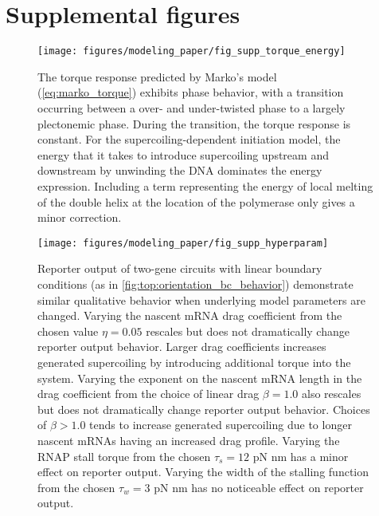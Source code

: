 \documentclass[11pt]{article}
\begin{document}
\section{Supplemental figures}
\FloatBarrier
\begin{figure}[htbp]
    \centering
    {\texttt{[image: figures/modeling\_paper/fig\_supp\_torque\_energy]}
    \label{fig:supp:torque_diagram}
    \label{fig:supp:energy_with_melting}
    }
    \caption{
         The torque response predicted by Marko's model (\cref{eq:marko_torque}) exhibits phase behavior, with a transition occurring between a over- and under-twisted phase to a largely plectonemic phase. During the transition, the torque response is constant.
         For the supercoiling-dependent initiation model, the energy that it takes to introduce supercoiling upstream and downstream by unwinding the DNA dominates the energy expression. Including a term representing the energy of local melting of the double helix at the location of the polymerase only gives a minor correction. 
    }
    \label{fig:top:supp_torque_energy}
\end{figure}

\begin{figure}[hbtp]
    \centering
    {\texttt{[image: figures/modeling\_paper/fig\_supp\_hyperparam]}
    \label{fig:hyperparam_drag_coeff}
    \label{fig:hyperparam_drag_exponent}
    \label{fig:hyperparam_stall_torque}
    \label{fig:hyperparam_stall_width}
    }
    \caption{Reporter output of two-gene circuits with linear boundary conditions (as in \cref{fig:top:orientation_bc_behavior}) demonstrate similar qualitative behavior when underlying model parameters are changed.
         Varying the nascent mRNA drag coefficient from the chosen value \(\eta = 0.05\) rescales but does not dramatically change reporter output behavior. Larger drag coefficients increases generated supercoiling by introducing additional torque into the system.
         Varying the exponent on the nascent mRNA length in the drag coefficient from the choice of linear drag \(\beta = 1.0\) also rescales but does not dramatically change reporter output behavior. Choices of \(\beta > 1.0\) tends to increase generated supercoiling due to longer nascent mRNAs having an increased drag profile.
         Varying the RNAP stall torque from the chosen \(\tau_s = 12\) pN nm has a minor effect on reporter output.
         Varying the width of the stalling function from the chosen \(\tau_w = 3\) pN nm has no noticeable effect on reporter output.
    }
    \label{fig:top:hyperparam}
\end{figure}
\end{document}
